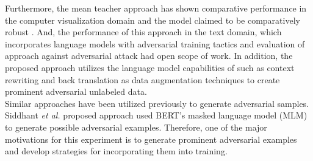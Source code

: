 \documentclass[%
	BCOR=8mm, %
	DIV=12,
	toc=bibliography, %
	toc=listof, %
	oneside, %
	egregdoesnotlikesansseriftitles, %
	]{scrbook}
\begin{document}
Furthermore, the mean teacher approach has shown comparative performance in the computer visualization domain and the model claimed to be comparatively robust \cite{tarvainen_mean_2018}. And, the performance of this approach in the text domain, which incorporates language models with adversarial training tactics  and evaluation of approach against adversarial attack had open scope of work. In addition, the proposed approach utilizes the language model capabilities of such as context rewriting and back translation as data augmentation techniques to create prominent adversarial unlabeled data. \\
Similar approaches have been utilized previously to generate adversarial samples. Siddhant \textit{et al.}  \cite{garg_bae_2020}  proposed approach used BERT's masked language model (MLM) to generate possible adversarial examples. Therefore, one of the major motivations for this experiment is to generate prominent adversarial examples and develop strategies for incorporating them into training.
\end{document}
